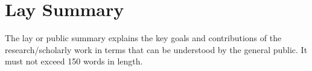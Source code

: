 \chapter{Lay Summary}
The lay or public summary explains the key goals and contributions of the
research/scholarly work in terms that can be understood by the general public.
It must not exceed 150 words in length.